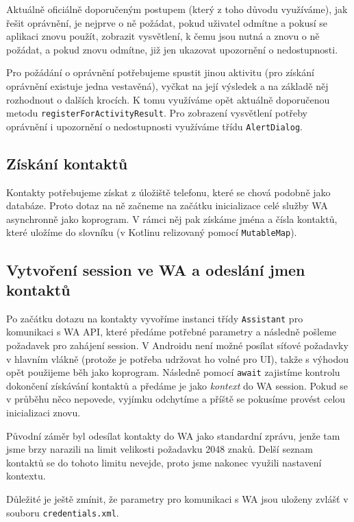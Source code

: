 Aktuálně oficiálně doporučeným postupem (který z toho důvodu využíváme), jak
řešit oprávnění, je nejprve o ně požádat, pokud uživatel odmítne a pokusí se
aplikaci znovu použít, zobrazit vysvětlení, k čemu jsou nutná a znovu o ně
požádat, a pokud znovu odmítne, již jen ukazovat upozornění o nedostupnosti.

Pro požádání o oprávnění potřebujeme spustit jinou aktivitu (pro získání
oprávnění existuje jedna vestavěná), vyčkat na její výsledek a na základě
něj rozhodnout o dalších krocích. K tomu využíváme opět aktuálně doporučenou
metodu \texttt{registerForActivityResult}. Pro zobrazení vysvětlení potřeby
oprávnění i upozornění o nedostupnosti využíváme třídu \texttt{AlertDialog}.

\subsection{Získání kontaktů}

Kontakty potřebujeme získat z úložiště telefonu, které se chová podobně jako
databáze. Proto dotaz na ně začneme na začátku inicializace celé služby WA
asynchronně jako koprogram. V rámci něj pak získáme jména a čísla kontaktů,
které uložíme do slovníku (v Kotlinu relizovaný pomocí \texttt{MutableMap}).

\subsection{Vytvoření session ve WA a odeslání jmen kontaktů}

Po začátku dotazu na kontakty vyvoříme instanci třídy \texttt{Assistant}
pro komunikaci s WA API, které předáme potřebné parametry a následně pošleme
požadavek pro zahájení session. V Androidu není možné posílat síťové požadavky
v hlavním vlákně (protože je potřeba udržovat ho volné pro UI), takže s výhodou
opět použijeme běh jako koprogram. Následně pomocí \texttt{await} zajistíme
kontrolu dokončení získávání kontaktů a předáme je jako \textit{kontext} do
WA session. Pokud se v průběhu něco nepovede, vyjímku odchytíme a příště
se pokusíme provést celou inicializaci znovu.

Původní záměr byl odesílat kontakty do WA jako standardní zprávu, jenže
tam jsme brzy narazili na limit velikosti požadavku 2048 znaků. Delší
seznam kontaktů se do tohoto limitu nevejde, proto jsme nakonec využili
nastavení kontextu.

Důležité je ještě zmínit, že parametry pro komunikaci s WA jsou uloženy
zvlášť v souboru \texttt{credentials.xml}.

